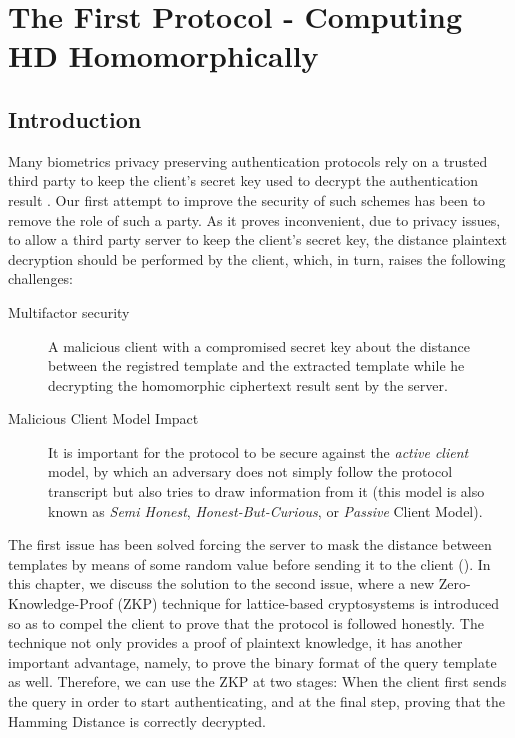 \chapter{The First Protocol - Computing HD Homomorphically}
\label{chap:firstProtocol}

\ifpdf
    \graphicspath{{Chapter3/Figs/Raster/}{Chapter3/Figs/PDF/}{Chapter3/Figs/}}
\else
    \graphicspath{{Chapter3/Figs/Vector/}{Chapter3/Figs/}}
\fi

\section{Introduction}
\label{sec:firstProcIntro}
Many biometrics privacy preserving authentication protocols rely on a trusted
third party to keep the client's secret key used to decrypt the authentication
result \cite{mandal2015comprehensive, hirano2013cryptographically, upmanyu2010blind}. Our first attempt to improve the security of such schemes has
been to remove the role of such a party. As it proves inconvenient, due to
privacy issues, to allow a third party server to keep the client's secret key, the
distance plaintext decryption should be performed by the client, which, in turn,
raises the following challenges:
\begin{description}
\item[Multifactor security] A malicious client with a compromised secret key
  about the distance between the registred template and the extracted template while he decrypting the homomorphic ciphertext result sent by the server.
\item[Malicious Client Model Impact] It is important for the protocol to be secure
  against the \textit{active client }model, by which an adversary does not simply follow the
  protocol transcript but also tries to draw information from it (this model is also known
  as \textit{Semi Honest}, \textit{Honest-But-Curious}, or \textit{Passive} Client Model). 
\end{description}

The first issue has been solved forcing the server to mask the distance between templates by means of some
random value before sending it to the client
(\cite{mandal2015comprehensive}). In this chapter, we discuss the solution to
the second issue, where a new Zero-Knowledge-Proof (ZKP) technique for
lattice-based cryptosystems is introduced so as to compel the client to prove that the protocol is followed honestly. The technique not only provides a
proof of plaintext knowledge, it has another important advantage, namely, to prove the
binary format of the query template as well. Therefore, we can use the ZKP at
two stages: When the client first sends the query in order to start authenticating,
and at the final step, proving that the Hamming Distance is correctly decrypted.


